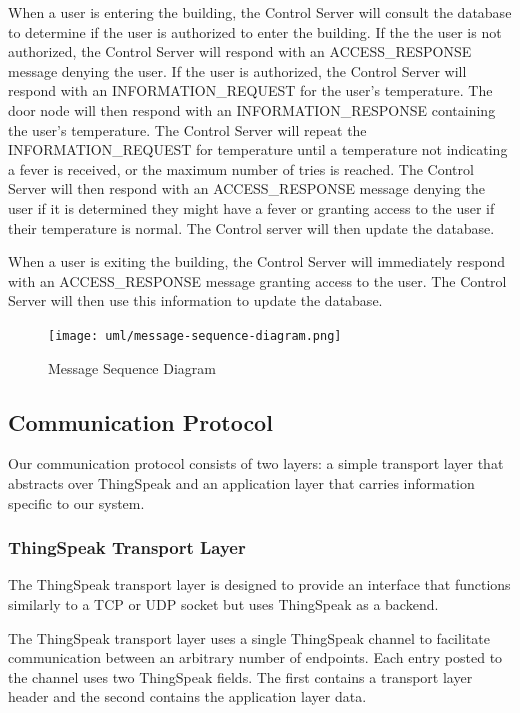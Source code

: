 When a user is entering the building, the Control Server will consult the
database to determine if the user is authorized to enter the building.  If the
the user is not authorized, the Control Server will respond with an
ACCESS\_RESPONSE message denying the user.  If the user is authorized, the
Control Server will respond with an INFORMATION\_REQUEST for the user's
temperature.  The door node will then respond with an INFORMATION\_RESPONSE
containing the user's temperature.  The Control Server will repeat the
INFORMATION\_REQUEST for temperature until a temperature not indicating a fever
is received, or the maximum number of tries is reached.  The Control Server
will then respond with an ACCESS\_RESPONSE message denying the user if it is
determined they might have a fever or granting access to the user if their
temperature is normal.  The Control server will then update the database.

When a user is exiting the building, the Control Server will immediately respond
with an ACCESS\_RESPONSE message granting access to the user.  The Control
Server will then use this information to update the database.

\begin{figure}[!htb]
\centering
\texttt{[image: uml/message-sequence-diagram.png]}
\caption{Message Sequence Diagram}
\label{fig:message-sequence-diagram}
\end{figure}

\subsection{Communication Protocol}
\label{subsec:communication-protocol}

Our communication protocol consists of two layers: a simple transport layer that
abstracts over ThingSpeak and an application layer that carries information
specific to our system.

\subsubsection{ThingSpeak Transport Layer}

The ThingSpeak transport layer is designed to provide an interface that
functions similarly to a TCP or UDP socket but uses ThingSpeak as a backend.

The ThingSpeak transport layer uses a single ThingSpeak channel to facilitate
communication between an arbitrary number of endpoints. Each entry posted to the
channel uses two ThingSpeak fields. The first contains a transport layer header
and the second contains the application layer data.

